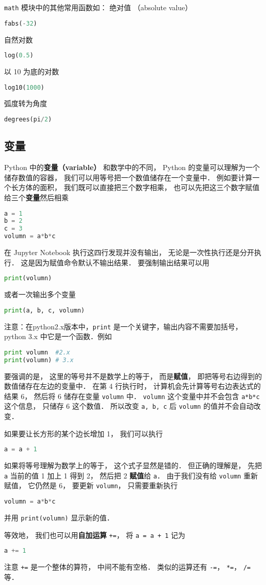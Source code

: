 \verb|math| 模块中的其他常用函数如： 绝对值 （absolute value）
\begin{lstlisting}[language=python]
fabs(-32)
\end{lstlisting}
自然对数
\begin{lstlisting}[language=python]
log(0.5)
\end{lstlisting}
以 10 为底的对数
\begin{lstlisting}[language=python]
log10(1000)
\end{lstlisting}
弧度转为角度
\begin{lstlisting}[language=python]
degrees(pi/2)
\end{lstlisting}

\subsection{变量}
Python 中的\textbf{变量（variable）} 和数学中的不同， Python 的变量可以理解为一个储存数值的容器， 我们可以用等号把一个数值储存在一个变量中． 例如要计算一个长方体的面积， 我们既可以直接把三个数字相乘， 也可以先把这三个数字赋值给三个\textbf{变量}然后相乘
\begin{lstlisting}[language=python]
a = 1
b = 2
c = 3
volumn = a*b*c
\end{lstlisting}
在 Jupyter Notebook 执行这四行发现并没有输出， 无论是一次性执行还是分开执行． 这是因为赋值命令默认不输出结果． 要强制输出结果可以用
\begin{lstlisting}[language=python]
print(volumn)
\end{lstlisting}
或者一次输出多个变量
\begin{lstlisting}[language=python]
print(a, b, c, volumn)
\end{lstlisting}
注意：在python2.x版本中，\verb|print| 是一个关键字，输出内容不需要加括号， python 3.x 中它是一个函数．例如
\begin{lstlisting}[language=python]
print volumn  #2.x
print(volumn) # 3.x
\end{lstlisting}
要强调的是， 这里的等号并不是数学上的等于， 而是\textbf{赋值}， 即把等号右边得到的数值储存在左边的变量中． 在第 4 行执行时， 计算机会先计算等号右边表达式的结果 6， 然后将 6 储存在变量 \verb|volumn| 中． \verb|volumn| 这个变量中并不会包含 \verb|a*b*c| 这个信息， 只储存 6 这个数值． 所以改变 \verb|a, b, c| 后 \verb|volumn| 的值并不会自动改变．

如果要让长方形的某个边长增加 1， 我们可以执行
\begin{lstlisting}[language=python]
a = a + 1
\end{lstlisting}
如果将等号理解为数学上的等于， 这个式子显然是错的． 但正确的理解是， 先把 \verb|a| 当前的值 1 加上 1 得到 2， 然后把 2 \textbf{赋值}给 \verb|a|． 由于我们没有给 \verb|volumn| 重新赋值， 它仍然是 6， 要更新 \verb|volumn|， 只需要重新执行
\begin{lstlisting}[language=python]
volumn = a*b*c
\end{lstlisting}
并用 \verb|print(volumn)| 显示新的值．

等效地， 我们也可以用\textbf{自加运算} \verb|+=|， 将 \verb|a = a + 1| 记为
\begin{lstlisting}[language=python]
a += 1
\end{lstlisting}
注意 \verb|+=| 是一个整体的算符， 中间不能有空格． 类似的运算还有 \verb|-=|， \verb|*=|， \verb|/=| 等．
